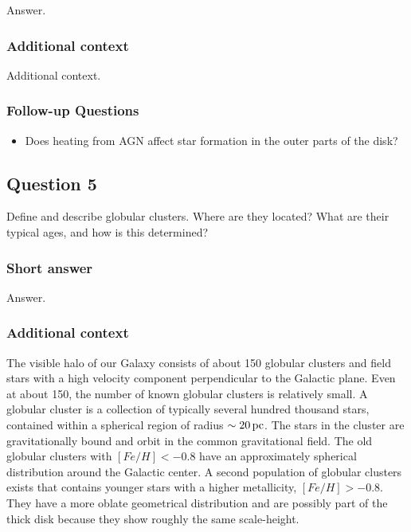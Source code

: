 \documentclass[a4paper,11pt]{article}
\begin{document}
Answer.

\subsubsection{Additional context}

Additional context.

\subsubsection{Follow-up Questions}

\begin{itemize}
    \item Does heating from AGN affect star formation in the outer parts of the disk?
\end{itemize}


\newpage
\subsection{Question 5}

Define and describe globular clusters. Where are they located? What are their typical ages, and how is this determined?

\subsubsection{Short answer}

Answer.

\subsubsection{Additional context}

The visible halo of our Galaxy consists of about 150 globular clusters and field stars with a high velocity component perpendicular to the Galactic plane. Even at about 150, the number of known globular clusters is relatively small. A globular cluster is a collection of typically several hundred thousand stars, contained within a spherical region of radius   $\sim20\,{\rm pc}$. The stars in the cluster are gravitationally bound and orbit in the common gravitational field. The old globular clusters with $[Fe/H]<-0.8$ have an approximately spherical distribution around the Galactic center. A second population of globular clusters exists that contains younger stars with a higher metallicity, $[Fe/H]>-0.8$. They have a more oblate geometrical distribution and are possibly part of the thick disk because they show roughly the same scale-height.
\end{document}
